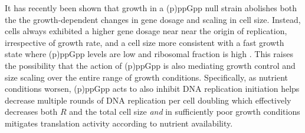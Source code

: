 It has recently been shown that growth in a (p)ppGpp null strain abolishes both
the the growth-dependent changes in gene dosage and  scaling in cell size.
Instead, cells always exhibited a higher gene dosage near  near the origin of
replication, irrespective of growth rate, and a cell size more consistent with a
fast growth state where (p)ppGpp levels are low \citep{fernandezcoll2020} and
ribosomal fraction is high \citep{zhu2019}. This raises the possibility that the
action of (p)ppGpp is also mediating growth control and size scaling over the
entire range of growth conditions. Specifically, as nutrient conditions worsen,
(p)ppGpp acts to also inhibit DNA replication initiation \citep{kraemer2019}
helps decrease multiple rounds of DNA replication per cell doubling which
effectively decreases both $R$ and the total cell size \textit{and} in
sufficiently poor growth conditions mitigates translation activity according to
nutrient availability.
